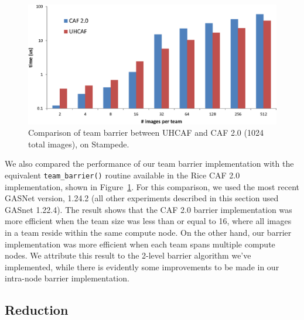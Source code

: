 \begin{figure}[h]
    \centering
    \includegraphics[width=\columnwidth]{figures/team-barrier-stampede-1024.eps}
    \caption{Comparison of team barrier between UHCAF and CAF 2.0 (1024 total
    images), on Stampede.}
    \label{fig:stampede-teambar-caf2}
\end{figure}

We also compared the performance of our team barrier implementation with the
equivalent \texttt{team\_barrier()} routine available in the Rice CAF 2.0
implementation, shown in Figure~\ref{fig:stampede-teambar-caf2}.  For this
comparison, we used the most recent GASNet version, 1.24.2 (all other
experiments described in this section used GASnet 1.22.4).  The result shows
that the CAF 2.0 barrier implementation was more efficient when the team size
was less than or equal to 16, where all images in a team reside within the
same compute node. On the other hand, our barrier implementation was more
efficient when each team spans multiple compute nodes.  We attribute this
result to the 2-level barrier algorithm we've implemented, while there is
evidently some improvements to be made in our intra-node barrier
implementation.

\subsection{Reduction}

